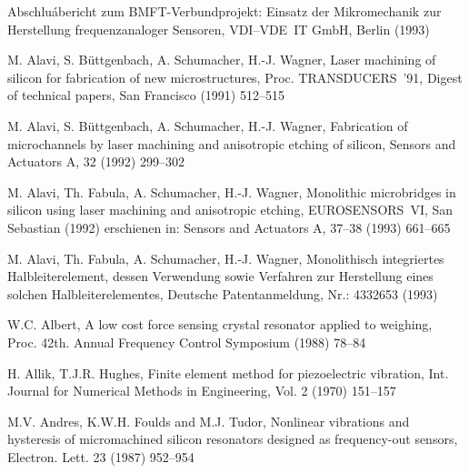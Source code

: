 
\newpage
{}
\begin{thebibliography}{xxx}

 Abschluábericht zum BMFT-Verbundprojekt: Einsatz der Mikromechanik
 zur Herstellung frequenzanaloger Sensoren, VDI--VDE~IT GmbH, Berlin (1993)


 M. Alavi, S. Büttgenbach, A. Schumacher, H.-J. Wagner,
 Laser machining of silicon for fabrication of new microstructures,
 Proc. TRANSDUCERS~'91, Digest of technical papers, San Francisco
 (1991) 512--515

 M. Alavi, S. Büttgenbach, A. Schumacher, H.-J. Wagner,
 Fabrication of microchannels by laser machining and anisotropic etching of
 silicon, Sensors and Actuators A, 32 (1992) 299--302

 M. Alavi, Th. Fabula, A. Schumacher, H.-J. Wagner,
 Monolithic microbridges in silicon using laser machining and anisotropic
 etching, EUROSENSORS~VI, San Sebastian (1992) erschienen in: Sensors and
 Actuators A, 37--38 (1993) 661--665

 M. Alavi, Th. Fabula, A. Schumacher, H.-J. Wagner,
 Monolithisch integriertes Halbleiterelement, dessen Verwendung sowie
 Verfahren zur Herstellung eines solchen Halbleiterelementes,
 Deutsche Patentanmeldung, Nr.: 4332653 (1993)


 W.C. Albert, A low cost force sensing crystal resonator applied to weighing,
 Proc. 42th. Annual Frequency Control Symposium (1988) 78--84

 H. Allik, T.J.R. Hughes, Finite element method for piezoelectric vibration,
 Int. Journal for Numerical Methods in Engineering, Vol. 2 (1970) 151--157

 M.V. Andres, K.W.H. Foulds and M.J. Tudor, Nonlinear vibrations and
 hysteresis of micromachined silicon resonators designed as frequency-out
 sensors, Electron. Lett. 23 (1987) 952--954


\end{thebibliography}
